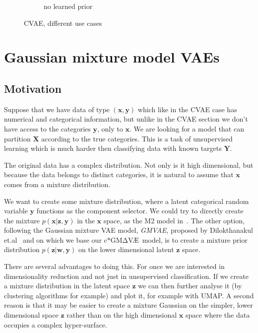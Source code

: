 \documentclass[11pt, a4paper]{report}
\theoremstyle{plain}
\theoremstyle{definition}
\theoremstyle{remark}
\newcommand{\X}{\mathbf{X}}
\newcommand{\x}{\mathbf{x}}
\newcommand{\z}{\mathbf{z}}
\newcommand{\Y}{\mathbf{Y}}
\newcommand{\y}{\mathbf{y}}
\newcommand{\w}{\mathbf{w}}
\newcommand{\gmvae}{c$\ast$GM$\mathrm{\Delta}$V\AE~}
\begin{document}
\begin{figure}[h]
\begin{subfigure}[b]{0.33\textwidth}
\caption{no learned prior}
\end{subfigure}
\caption{CVAE, different use cases}
\label{fig:cvaeumap}
\end{figure}

\chapter{Gaussian mixture model VAEs}
\section{Motivation}

Suppose that we have data of type $(\x,\y)$ which like in the CVAE case has numerical and 
categorical information, but unlike in the CVAE section we don't have access to
the categories $\y$, only to $\x$. 
We are looking for a model that can partition
$\X$ according to the true categories.
This is a task of unsupervised learning which is much harder then classifying
data with known targets $\Y$.

The original data has a complex distribution. Not only is it high dimensional,
but because the data belongs to distinct categories, it is natural to assume
that $\x$ comes from a mixture distribution.

We want to create some mixture distribution, where a latent categorical random
variable $\y$ functions as the component selector. We could try to directly
create the mixture $p(\x | \z, \y)$ in the $\x$ space, as the M2 model
in~\cite{kingma2014semi}.
The other option, following the Gaussian mixture VAE model, \emph{GMVAE}, proposed by
Dilokthanakul et.al~\cite{dilokthanakul2016deep} and on which we base our \gmvae model,
is to create a mixture prior distribution $p(\z | \w, \y)$ on the lower
dimensional latent $\z$ space.

There are several advantages to doing this. For once we are interested in
dimensionality reduction and not just in unsupervised classification. If we
create a mixture distribution in the latent space $\z$ we can then further
analyse it (by clustering algorithms for example) and plot it, for example with
UMAP. A second reason is that it may be easier to create a mixture Gaussian on
the simpler, lower dimensional space $\z$ rather than on the high dimensional
$\x$ space where the data occupies a complex hyper-surface.

%
\end{document}
